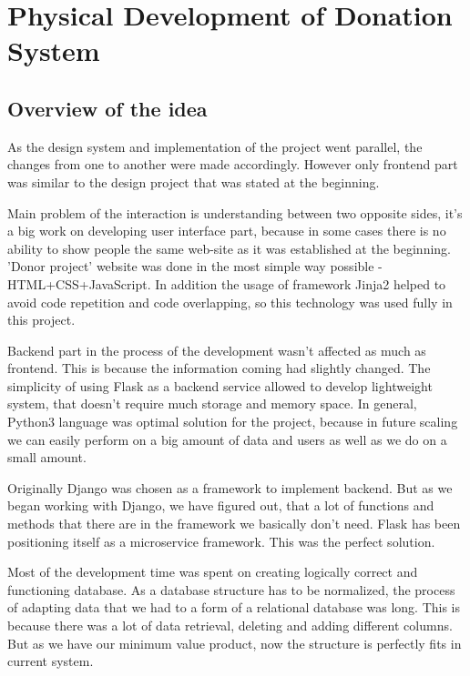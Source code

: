 \chapter{Physical Development of Donation System}\label{ch:C}
\section{Overview of the idea}
As the design system and implementation of the project went parallel, the changes from one to another were made accordingly. However only frontend part was similar to the design project that was stated at the beginning. 
\par
Main problem of the interaction is understanding between two opposite sides, it's a big work on developing user interface part, because in some cases there is no ability to show people the same web-site as it was established at the beginning. 'Donor project' website was done in the most simple way possible - HTML+CSS+JavaScript. In addition the usage of framework Jinja2 helped to avoid code repetition and code overlapping, so this technology was used fully in this project.
\par
Backend part in the process of the development wasn't affected as much as frontend. This is because the information coming had slightly changed. The simplicity of using Flask as a backend service allowed to develop lightweight system, that doesn't require much storage and memory space. In general, Python3 language was optimal solution for the project, because in future scaling we can easily perform on a big amount of data and users as well as we do on a small amount.
\par
Originally Django was chosen as a framework to implement backend. But as we began working with Django, we have figured out, that a lot of functions and methods that there are in the framework we basically don't need. Flask has been positioning itself as a microservice framework. This was the perfect solution.
\par
Most of the development time was spent on creating logically correct and functioning database. As a database structure has to be normalized, the process of adapting data that we had to a form of a relational database was long. This is because there was a lot of data retrieval, deleting and adding different columns. But as we have our minimum value product, now the structure is perfectly fits in current system.

